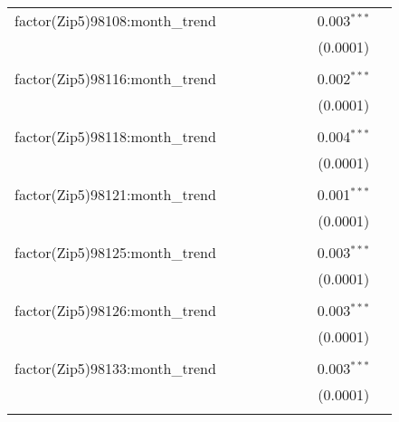 \begin{table}[H]
{\begin{tabular}{@{\extracolsep{5pt}}lcccccccc}
  factor(Zip5)98108:month\_trend &  &  &  &  &  &  & 0.003$^{***}$ &  \\  

   &  &  &  &  &  &  & (0.0001) &  \\  

   & & & & & & & & \\  

  factor(Zip5)98116:month\_trend &  &  &  &  &  &  & 0.002$^{***}$ &  \\  

   &  &  &  &  &  &  & (0.0001) &  \\  

   & & & & & & & & \\  

  factor(Zip5)98118:month\_trend &  &  &  &  &  &  & 0.004$^{***}$ &  \\  

   &  &  &  &  &  &  & (0.0001) &  \\  

   & & & & & & & & \\  

  factor(Zip5)98121:month\_trend &  &  &  &  &  &  & 0.001$^{***}$ &  \\  

   &  &  &  &  &  &  & (0.0001) &  \\  

   & & & & & & & & \\  

  factor(Zip5)98125:month\_trend &  &  &  &  &  &  & 0.003$^{***}$ &  \\  

   &  &  &  &  &  &  & (0.0001) &  \\  

   & & & & & & & & \\  

  factor(Zip5)98126:month\_trend &  &  &  &  &  &  & 0.003$^{***}$ &  \\  

   &  &  &  &  &  &  & (0.0001) &  \\  

   & & & & & & & & \\  

  factor(Zip5)98133:month\_trend &  &  &  &  &  &  & 0.003$^{***}$ &  \\  

   &  &  &  &  &  &  & (0.0001) &  \\  

   & & & & & & & & \\  


\end{tabular}}
\end{table}
